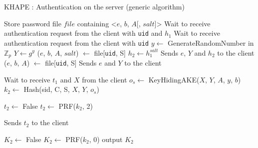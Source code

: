 ﻿\documentclass[../report.tex]{subfiles}
\begin{document}
\begin{algorithm}
\caption{KHAPE : Authentication on the server (generic algorithm)}
\label{alg:login_server}
\begin{algorithmic}
\Require Store password file $file$ containing <$e$, $b$, $A$[, $salt$]>
    \State Wait to receive authentication request from the client with \verb|uid| and $h_1$
\Else
    \State Wait to receive authentication request from the client with \verb|uid|
\EndIf
\State $y \gets$ GenerateRandomNumber in $\mathbb{Z}_p$
\State $Y \gets g^y$
    \State ($e$, $b$, $A$, $salt$) $\gets$ file[\verb|uid|, S] %
    \State $h_2 \gets h_1^{salt}$
    \State Sends $e$, $Y$ and $h_2$ to the client
\Else
    \State ($e$, $b$, $A$) $\gets$ file[\verb|uid|, S] %
    \State Sends $e$ and $Y$ to the client
\EndIf

\State Wait to receive $t_1$ and $X$ from the client
\State $o_s \gets$ KeyHidingAKE($X$, $Y$, $A$, $y$, $b$)
\State $k_2 \gets$ Hash(sid, C, S, $X$, $Y$, $o_s$)

    \State $t_2 \gets$ False
\Else
    \State $t_2 \gets$ PRF($k_2$, 2)
\EndIf

\State Sends $t_2$ to the client

    \State $K_2 \gets$ False
\Else
    \State $K_2 \gets$ PRF($k_2$, 0)
\EndIf
\State output $K_2$
\end{algorithmic}
\end{algorithm}

\end{document}
